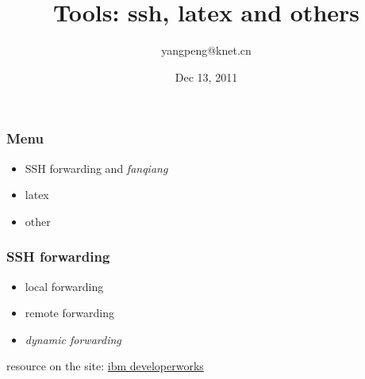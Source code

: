 \documentclass{beamer}
\title[Tools: SSH, latex and others]{Tools: ssh, latex and others}
\author{yangpeng@knet.cn}
\date{Dec 13, 2011}
\begin{document}
\begin{frame}
  \titlepage
\end{frame}



\begin{frame}
  \frametitle{Menu}
  \begin{itemize}

  \item SSH forwarding and \emph{fanqiang} \\
  \item latex \\
  \item other \\

  \end{itemize}
\end{frame}




\begin{frame}
  \frametitle{SSH forwarding}

  \begin{itemize}
  \item local forwarding \\
  \item remote forwarding \\
  \item \emph{dynamic forwarding} \\
  \end{itemize}


  resource on the site: 
  \href{https://www.ibm.com/developerworks/cn/linux/l-cn-sshforward/}{ibm developerworks} \\



\end{frame}
\end{document}
